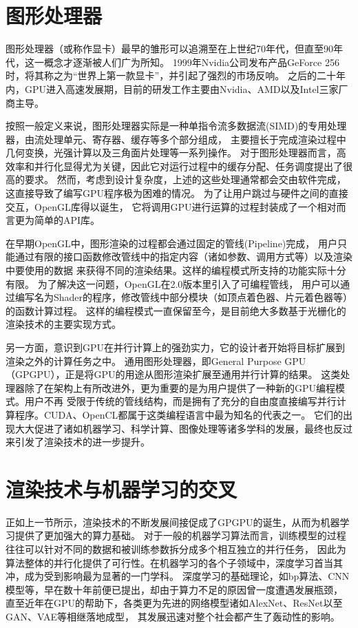 \section{图形处理器}
图形处理器（或称作显卡）最早的雏形可以追溯至在上世纪70年代，但直至90年代，这一概念才逐渐被人们广为所知。
1999年Nvidia公司发布产品GeForce 256时，将其称之为“世界上第一款显卡”\cite{firstGPU}，并引起了强烈的市场反响。
之后的二十年内，GPU进入高速发展期，目前的研发工作主要由Nvidia、AMD以及Intel三家厂商主导。

按照一般定义来说，图形处理器实际是一种单指令流多数据流(SIMD)的专用处理器，由流处理单元、寄存器、缓存等多个部分组成，
主要擅长于完成渲染过程中几何变换，光强计算以及三角面片处理等一系列操作。
对于图形处理器而言，高效率和并行化显得尤为关键，因此它对运行过程中的缓存分配、任务调度提出了很高的要求。
然而，考虑到设计复杂度，上述的这些处理通常都会交由软件完成，这直接导致了编写GPU程序极为困难的情况。
为了让用户跳过与硬件之间的直接交互，OpenGL库得以诞生，
它将调用GPU进行运算的过程封装成了一个相对而言更为简单的API库。

在早期OpenGL中，图形渲染的过程都会通过固定的管线(Pipeline)完成，
用户只能通过有限的接口函数修改管线中的指定内容（诸如参数、调用方式等）以及渲染中要使用的数据
来获得不同的渲染结果。这样的编程模式所支持的功能实际十分有限。
为了解决这一问题，OpenGL在2.0版本里引入了可编程管线，
用户可以通过编写名为Shader的程序，修改管线中部分模块（如顶点着色器、片元着色器等）的函数计算过程。
这样的编程模式一直保留至今，是目前绝大多数基于光栅化的渲染技术的主要实现方式。

另一方面，意识到GPU在并行计算上的强劲实力，它的设计者开始将目标扩展到渲染之外的计算任务之中。
通用图形处理器，即General Purpose GPU（GPGPU），正是将GPU的用途从图形渲染扩展至通用并行计算的结果。
这类处理器除了在架构上有所改进外，更为重要的是为用户提供了一种新的GPU编程模式。用户不再
受限于传统的管线结构，而是拥有了充分的自由度直接编写并行计算程序。CUDA、OpenCL都属于这类编程语言中最为知名的代表之一。
它们的出现大大促进了诸如机器学习、科学计算、图像处理等诸多学科的发展，最终也反过来引发了渲染技术的进一步提升。

\section{渲染技术与机器学习的交叉}

正如上一节所示，渲染技术的不断发展间接促成了GPGPU的诞生，从而为机器学习提供了更加强大的算力基础。
对于一般的机器学习算法而言，训练模型的过程往往可以针对不同的数据和被训练参数拆分成多个相互独立的并行任务，
因此为算法整体的并行化提供了可行性。在机器学习的各个子领域中，深度学习首当其冲，成为受到影响最为显著的一门学科。
深度学习的基础理论，如bp算法、CNN模型等，早在数十年前便已提出，却由于算力不足的原因曾一度遭遇发展瓶颈，
直至近年在GPU的帮助下，各类更为先进的网络模型诸如AlexNet\cite{AlexNet}、ResNet\cite{ResNet}以至GAN\cite{GAN}、VAE\cite{VAE}等相继落地成型，
其发展迅速对整个社会都产生了轰动性的影响。

